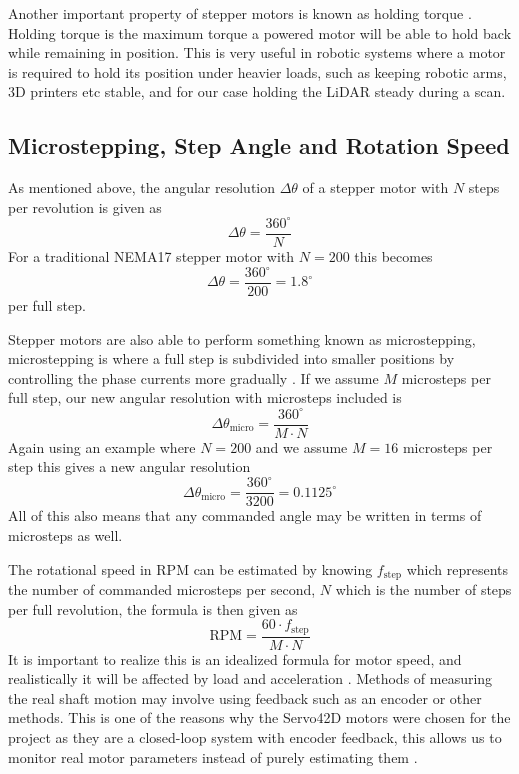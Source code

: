 Another important property of stepper motors is known as holding torque \cite{StepperBasics}. Holding torque is the maximum torque a powered motor will be able to hold back while remaining in position.
This is very useful in robotic systems where a motor is required to hold its position under heavier loads, such as keeping robotic arms, 3D printers etc stable, and for our case holding the LiDAR steady during a scan.

\subsection{Microstepping, Step Angle and Rotation Speed}
As mentioned above, the angular resolution \(\Delta \theta\) of a stepper motor with \(N\) steps per revolution is given as
\begin{equation}
    \Delta \theta = \frac{360^\circ}{N}
\end{equation}
For a traditional NEMA17 stepper motor with \(N=200\) this becomes
\begin{equation}
    \Delta \theta = \frac{360^\circ}{200} = 1.8^\circ
\end{equation}
per full step.

Stepper motors are also able to perform something known as microstepping, microstepping is where a full step is subdivided into smaller positions by controlling the phase currents more gradually \cite{MicrosteppingTI}.
If we assume \(M\) microsteps per full step, our new angular resolution with microsteps included is
\begin{equation}
    \Delta \theta_{\mathrm{micro}} = \frac{360^\circ}{M\cdot N}
\end{equation}
Again using an example where \(N=200\) and we assume \(M=16\) microsteps per step this gives a new angular resolution 
\begin{equation}
    \Delta \theta_{\mathrm{micro}}=\frac{360^\circ}{3200}=0.1125^\circ
\end{equation}
All of this also means that any commanded angle may be written in terms of microsteps as well.

The rotational speed in RPM can be estimated by knowing \(f_{\mathrm{step}}\) which represents the number of commanded microsteps per second, \(N\) which is the number of steps per full revolution, the formula is then given as
\begin{equation}
    \mathrm{RPM} = \frac{60\cdot f_{\mathrm{step}}}{M\cdot N}
\end{equation}
It is important to realize this is an idealized formula for motor speed, and realistically it will be affected by load and acceleration \cite{MicrosteppingTI}.
Methods of measuring the real shaft motion may involve using feedback such as an encoder or other methods. This is one of the reasons why the Servo42D motors were chosen for the project as they are a closed-loop system with encoder feedback, this allows us to monitor real motor parameters instead of purely estimating them \cite{Makerbase}.

